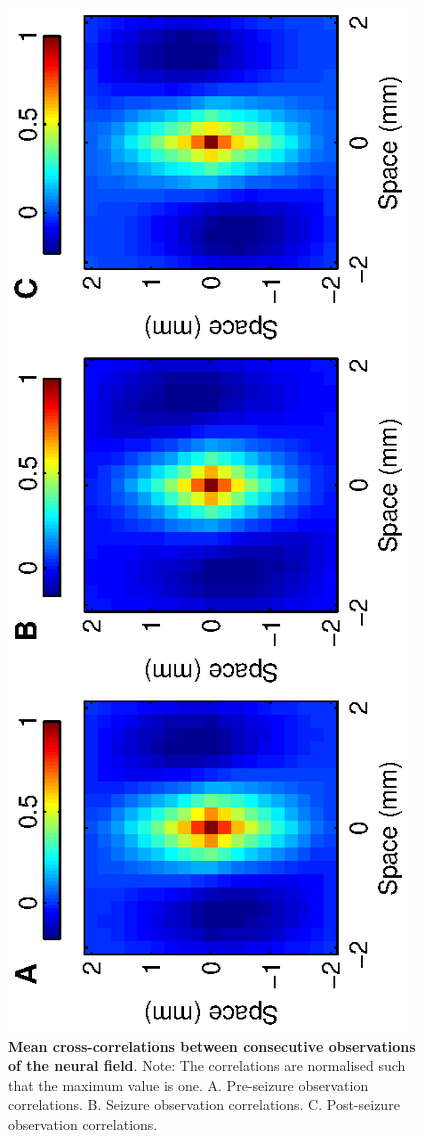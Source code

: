 \documentclass[]{article}
\begin{document}
\begin{figure}[!ht]
\begin{center}
\includegraphics{./Figures/CrossCorr2D.eps}
\end{center}
\caption{{\bf Mean cross-correlations between consecutive observations of the neural field}. Note: The correlations are normalised such that the maximum value is one. A. Pre-seizure observation correlations. B. Seizure observation correlations. C. Post-seizure observation correlations.}
\label{fig:SpatialCrossCorrelation}
\end{figure}
\end{document}
